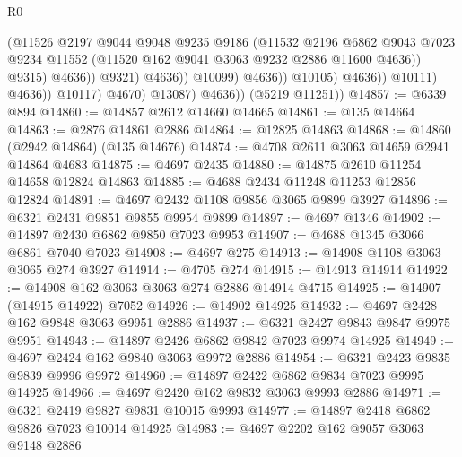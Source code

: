 \begin{lexlean}{R0}
\begin{coremodule}
                                            (@11526
                                              @2197
                                              @9044
                                              @9048
                                              @9235
                                              @9186
                                              (@11532
                                                @2196
                                                @6862
                                                @9043
                                                @7023
                                                @9234
                                                @11552
                                                (@11520 @162 @9041 @3063 @9232 @2886 @11600 @4636))
                                              @9315)
                                            @4636))
                                        @9321)
                                      @4636))
                                  @10099)
                                @4636))
                            @10105)
                          @4636))
                      @10111)
                    @4636))
                @10117)
              @4670)
            @13087)
          @4636))
      (@5219 @11251))
@14857 := @6339 @894
@14860 := @14857 @2612 @14660 @14665
@14861 := @135 @14664
@14863 := @2876 @14861 @2886
@14864 := @12825 @14863
@14868 := @14860 (@2942 @14864) (@135 @14676)
@14874 := @4708 @2611 @3063 @14659 @2941 @14864 @4683
@14875 := @4697 @2435
@14880 := @14875 @2610 @11254 @14658 @12824 @14863
@14885 := @4688 @2434 @11248 @11253 @12856 @12824
@14891 := @4697 @2432 @1108 @9856 @3065 @9899 @3927
@14896 := @6321 @2431 @9851 @9855 @9954 @9899
@14897 := @4697 @1346
@14902 := @14897 @2430 @6862 @9850 @7023 @9953
@14907 := @4688 @1345 @3066 @6861 @7040 @7023
@14908 := @4697 @275
@14913 := @14908 @1108 @3063 @3065 @274 @3927
@14914 := @4705 @274
@14915 := @14913 @14914
@14922 := @14908 @162 @3063 @3063 @274 @2886 @14914 @4715
@14925 := @14907 (@14915 @14922) @7052
@14926 := @14902 @14925
@14932 := @4697 @2428 @162 @9848 @3063 @9951 @2886
@14937 := @6321 @2427 @9843 @9847 @9975 @9951
@14943 := @14897 @2426 @6862 @9842 @7023 @9974 @14925
@14949 := @4697 @2424 @162 @9840 @3063 @9972 @2886
@14954 := @6321 @2423 @9835 @9839 @9996 @9972
@14960 := @14897 @2422 @6862 @9834 @7023 @9995 @14925
@14966 := @4697 @2420 @162 @9832 @3063 @9993 @2886
@14971 := @6321 @2419 @9827 @9831 @10015 @9993
@14977 := @14897 @2418 @6862 @9826 @7023 @10014 @14925
@14983 := @4697 @2202 @162 @9057 @3063 @9148 @2886

\end{coremodule}
\end{lexlean}
